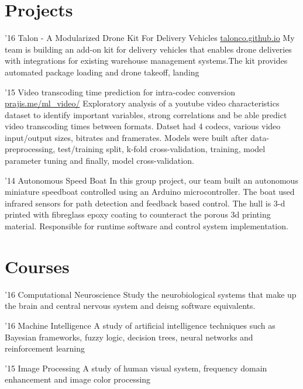 \documentclass{tccv}
\begin{document}
\section{Projects}

\begin{yearlist}

\item{'16}
  {Talon - A Modularized Drone Kit For Delivery Vehicles \href{http://talonco.github.io}{talonco.github.io}}
      {My team is building an add-on kit for delivery vehicles that enables drone deliveries with integrations for existing warehouse management systems.The kit provides automated package loading and drone takeoff, landing}

      \item{'15}
        {Video transcoding time prediction for intra-codec conversion \href{http://prajis.me/ml\_video}{prajis.me/ml\_video/}}
        {Exploratory analysis of a youtube video characteristics dataset to identify important variables, strong correlations and be able predict video transcoding times between formats. Datset had 4 codecs, various video input/output sizes, bitrates and framerates. Models were built after data-preprocessing, test/training split, k-fold cross-validation, training, model parameter tuning and finally, model cross-validation.}
        
     \item{'14}
         {Autonomous Speed Boat}
         {In this group project, our team built an autonomous miniature speedboat controlled using an Arduino microcontroller. The boat used infrared sensors for path detection and feedback based control. The hull is 3-d printed with fibreglass epoxy coating to counteract the porous 3d printing material. Responsible for runtime software and control system implementation.} 

\end{yearlist}

\section{Courses}

\begin{yearlist}

\item{'16}
     {Computational Neuroscience}
     {Study the neurobiological systems that make up the brain and central nervous system and deisng software equivalents.}

\item{'16}
     {Machine Intelligence}
     {A study of artificial intelligence techniques such as Bayesian frameworks, fuzzy logic, decision trees, neural networks and reinforcement learning}

\item{'15}
     {Image Processing}
     {A study of human visual system, frequency domain enhancement and image color processing}



\end{yearlist}
\end{document}
